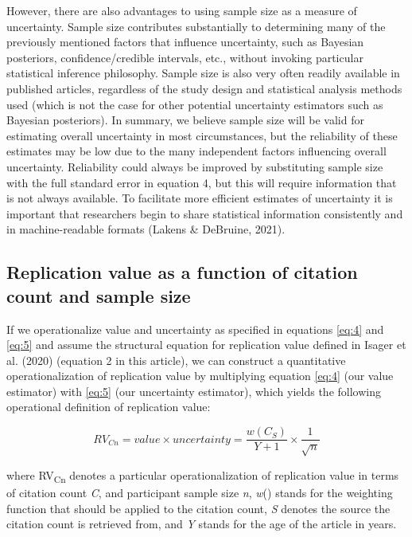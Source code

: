 \documentclass[
  english,
  man,floatsintext]{apa6}
\begin{document}
However, there are also advantages to using sample size as a measure of uncertainty. Sample size contributes substantially to determining many of the previously mentioned factors that influence uncertainty, such as Bayesian posteriors, confidence/credible intervals, etc., without invoking particular statistical inference philosophy. Sample size is also very often readily available in published articles, regardless of the study design and statistical analysis methods used (which is not the case for other potential uncertainty estimators such as Bayesian posteriors). In summary, we believe sample size will be valid for estimating overall uncertainty in most circumstances, but the reliability of these estimates may be low due to the many independent factors influencing overall uncertainty. Reliability could always be improved by substituting sample size with the full standard error in equation 4, but this will require information that is not always available. To facilitate more efficient estimates of uncertainty it is important that researchers begin to share statistical information consistently and in machine-readable formats (Lakens \& DeBruine, 2021).

\hypertarget{replication-value-as-a-function-of-citation-count-and-sample-size}{%
\subsection{Replication value as a function of citation count and sample size}\label{replication-value-as-a-function-of-citation-count-and-sample-size}}

If we operationalize value and uncertainty as specified in equations \eqref{eq:4} and \eqref{eq:5} and assume the structural equation for replication value defined in Isager et al. (2020) (equation 2 in this article), we can construct a quantitative operationalization of replication value by multiplying equation \eqref{eq:4} (our value estimator) with \eqref{eq:5} (our uncertainty estimator), which yields the following operational definition of replication value:

\begin{equation} 
  \tag{6}
  RV_{Cn} = value\times uncertainty = \frac{w(C_{S})}{Y+1}\times\frac{1}{\sqrt{n}}
  \label{eq:6}
\end{equation}

where RV\textsubscript{Cn} denotes a particular operationalization of replication value in terms of citation count \emph{C}, and participant sample size \emph{n}, \emph{w}() stands for the weighting function that should be applied to the citation count, \emph{S} denotes the source the citation count is retrieved from, and \emph{Y} stands for the age of the article in years.
\end{document}
